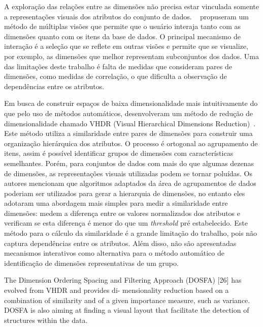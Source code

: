 
A exploração das relações entre as dimensões não precisa estar vinculada somente a representações visuais dos atributos do conjunto de dados. \citeauthor{Turkay2011}~\cite{Turkay2011} propuseram um método de múltiplas visões que permite que o usuário interaja tanto com as dimensões quanto com os itens da base de dados. O principal mecanismo de interação é a seleção que se reflete em outras visões e permite que se visualize, por exemplo, as dimensões que melhor representam subconjuntos dos dados. Uma das limitações deste trabalho é falta de medidas que consideram pares de dimensões, como medidas de correlação, o que dificulta a observação de dependências entre os atributos.   


Em busca de construir espaços de baixa dimensionalidade mais intuitivamente do que pelo uso de métodos automáticos, \citeauthor{Yang2003} desenvolveram um método de redução de dimensionalidade chamado VHDR (Visual Hierarchical Dimensions Reduction)~\cite{Yang2007}. Este método utiliza a similaridade entre pares de dimensões para construir uma organização hierárquica dos atributos. O processo é ortogonal ao agrupamento de itens, assim é possível identificar grupos de dimensões com características semelhantes. Porém, para conjuntos de dados com mais do que algumas dezenas de dimensões, as representações visuais utilizadas podem se tornar poluídas. Os autores mencionam que algoritmos adaptados da área de agrupamentos de dados poderiam ser utilizados para gerar a hierarquia de dimensões, no entanto eles adotaram uma abordagem mais simples para medir a similaridade entre dimensões: medem a diferença entre os valores normalizados dos atributos e verificam se esta diferença é menor do que um \textit{threshold} pré estabelecido. Este método para o cálculo da similaridade é a grande limitação do trabalho, pois não captura dependências entre os atributos. Além disso, não são apresentadas mecanismos interativos como alternativa para o método automático de identificação de dimensões representativas de um grupo. 



The Dimension Ordering Spacing and Filtering Approach (DOSFA) [26] has evolved from VHDR and provides di- mensionality reduction based on a combination of similarity and of a given importance measure, such as variance. DOSFA is also aiming at finding a visual layout that facilitate the detection of structures within the data.

